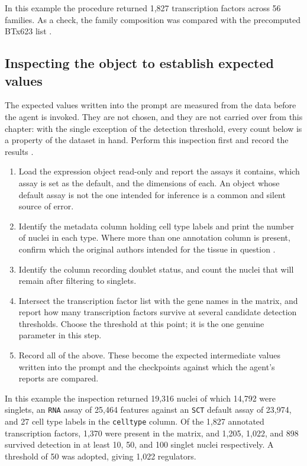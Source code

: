 In this example the procedure returned 1,827 transcription factors across 56 families. As a check, the family composition was compared with the precomputed BTx623 list .

\subsection{Inspecting the object to establish expected values}

The expected values written into the prompt are measured from the data before the agent is invoked. They are not chosen, and they are not carried over from this chapter: with the single exception of the detection threshold, every count below is a property of the dataset in hand. Perform this inspection first and record the results .

\begin{enumerate}[leftmargin=*]
\item Load the expression object read-only and report the assays it contains, which assay is set as the default, and the dimensions of each. An object whose default assay is not the one intended for inference is a common and silent source of error.

\item Identify the metadata column holding cell type labels and print the number of nuclei in each type. Where more than one annotation column is present, confirm which the original authors intended for the tissue in question .

\item Identify the column recording doublet status, and count the nuclei that will remain after filtering to singlets.

\item Intersect the transcription factor list with the gene names in the matrix, and report how many transcription factors survive at several candidate detection thresholds. Choose the threshold at this point; it is the one genuine parameter in this step.

\item Record all of the above. These become the expected intermediate values written into the prompt  and the checkpoints against which the agent's reports are compared.
\end{enumerate}

In this example the inspection returned 19,316 nuclei of which 14,792 were singlets, an \texttt{RNA} assay of 25,464 features against an \texttt{SCT} default assay of 23,974, and 27 cell type labels in the \texttt{celltype} column. Of the 1,827 annotated transcription factors, 1,370 were present in the matrix, and 1,205, 1,022, and 898 survived detection in at least 10, 50, and 100 singlet nuclei respectively. A threshold of 50 was adopted, giving 1,022 regulators.

